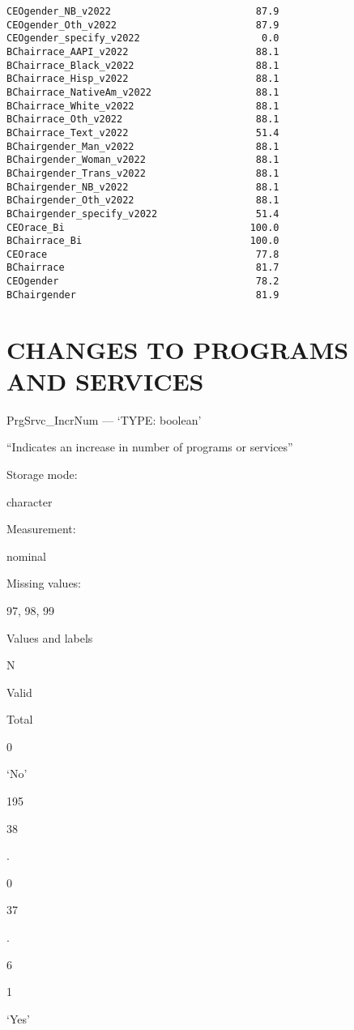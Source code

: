 \documentclass[
  letterpaper,
]{scrbook}
\begin{document}
\begin{verbatim}
CEOgender_NB_v2022                         87.9
CEOgender_Oth_v2022                        87.9
CEOgender_specify_v2022                     0.0
BChairrace_AAPI_v2022                      88.1
BChairrace_Black_v2022                     88.1
BChairrace_Hisp_v2022                      88.1
BChairrace_NativeAm_v2022                  88.1
BChairrace_White_v2022                     88.1
BChairrace_Oth_v2022                       88.1
BChairrace_Text_v2022                      51.4
BChairgender_Man_v2022                     88.1
BChairgender_Woman_v2022                   88.1
BChairgender_Trans_v2022                   88.1
BChairgender_NB_v2022                      88.1
BChairgender_Oth_v2022                     88.1
BChairgender_specify_v2022                 51.4
CEOrace_Bi                                100.0
BChairrace_Bi                             100.0
CEOrace                                    77.8
BChairrace                                 81.7
CEOgender                                  78.2
BChairgender                               81.9
\end{verbatim}

\chapter{CHANGES TO PROGRAMS AND
SERVICES}\label{changes-to-programs-and-services-1}

PrgSrvc\_IncrNum --- {`TYPE: boolean'}

``Indicates an increase in number of programs or services''

Storage mode:

character

Measurement:

nominal

Missing values:

97, 98, 99

Values and labels

N

Valid

Total

0

`No'

195

38

.

0

37

.

6

1

`Yes'
\end{document}
